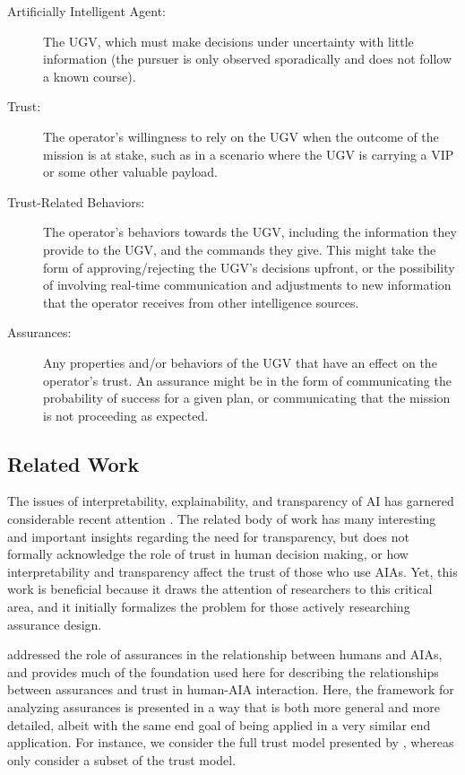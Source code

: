    \begin{description}
        \item [Artificially Intelligent Agent:] The UGV, which must make decisions under uncertainty with little information (the pursuer is only observed sporadically and does not follow a known course). 
        \item [Trust:] The operator's willingness to rely on the UGV when the outcome of the mission is at stake, such as in a scenario where the UGV is carrying a VIP or some other valuable payload.
        \item [Trust-Related Behaviors:] The operator's behaviors towards the UGV, including the information they provide to the UGV, and the commands they give. This might take the form of approving/rejecting the UGV's decisions upfront, or the possibility of involving real-time communication and adjustments to new information that the operator receives from other intelligence sources.
        \item [Assurances:] Any properties and/or behaviors of the UGV that have an effect on the operator's trust. An assurance might be in the form of communicating the probability of success for a given plan, or communicating that the mission is not proceeding as expected.
    \end{description}

\subsection{Related Work}\label{sec:rel_work}
    The issues of interpretability, explainability, and transparency of AI has garnered considerable recent attention \cite{Doshi-Velez2017-xy, Weller2017-zx, Lipton2016-ug, Gunning2017-ih}. The related body of work has many interesting and important insights regarding the need for transparency, but does not formally acknowledge the role of trust in human decision making, or how interpretability and transparency affect the trust of those who use AIAs. Yet, this work is beneficial because it draws the attention of researchers to this critical area, and it initially formalizes the problem for those actively researching assurance design.

    \citet{Lillard2016-yg} addressed the role of assurances in the relationship between humans and AIAs, and provides much of the foundation used here for describing the relationships between assurances and trust in human-AIA interaction. Here, the framework for analyzing assurances is presented in a way that is both more general and more detailed, albeit with the same end goal of being applied in a very similar end application. For instance, we consider the full trust model presented by \citet{McKnight2001-fa}, whereas \citeauthor{Lillard2016-yg} only consider a subset of the trust model.

